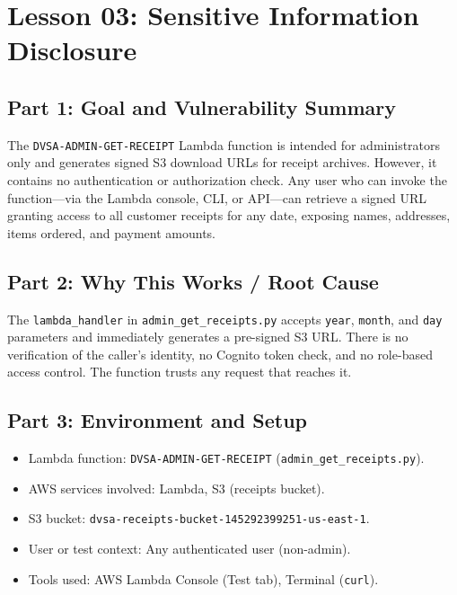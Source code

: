 \documentclass[12pt]{report}
\begin{document}
\clearpage

\chapter{Lesson 03: Sensitive Information Disclosure}

\section{Part 1: Goal and Vulnerability Summary}
The \texttt{DVSA-ADMIN-GET-RECEIPT} Lambda function is intended for administrators only and generates signed S3 download URLs for receipt archives. However, it contains no authentication or authorization check. Any user who can invoke the function---via the Lambda console, CLI, or API---can retrieve a signed URL granting access to all customer receipts for any date, exposing names, addresses, items ordered, and payment amounts.

\section{Part 2: Why This Works / Root Cause}
The \texttt{lambda\_handler} in \texttt{admin\_get\_receipts.py} accepts \texttt{year}, \texttt{month}, and \texttt{day} parameters and immediately generates a pre-signed S3 URL. There is no verification of the caller's identity, no Cognito token check, and no role-based access control. The function trusts any request that reaches it.

\section{Part 3: Environment and Setup}
\begin{itemize}
  \item Lambda function: \texttt{DVSA-ADMIN-GET-RECEIPT} (\texttt{admin\_get\_receipts.py}).
  \item AWS services involved: Lambda, S3 (receipts bucket).
  \item S3 bucket: \texttt{dvsa-receipts-bucket-145292399251-us-east-1}.
  \item User or test context: Any authenticated user (non-admin).
  \item Tools used: AWS Lambda Console (Test tab), Terminal (\texttt{curl}).
\end{itemize}
\end{document}
